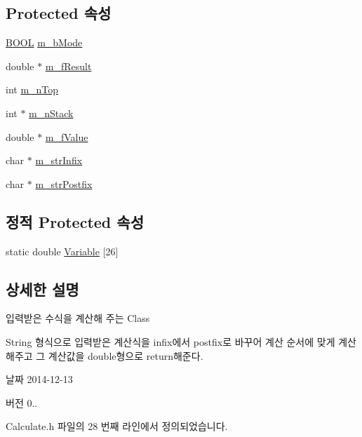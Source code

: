 \subsection*{Protected 속성}
\begin{DoxyCompactItemize}
\item 
\hyperlink{_calculate_8h_a3e5b8192e7d9ffaf3542f1210aec18dd}{B\+O\+O\+L} \hyperlink{class_calculate_a91ed53268a8f29f54757037bc28d35e0}{m\+\_\+b\+Mode}
\item 
double $\ast$ \hyperlink{class_calculate_a5ffe97b9c4358acf90360d328b9144c0}{m\+\_\+f\+Result}
\item 
int \hyperlink{class_calculate_a9f6afe7d8278100e1f27977aaeba0a72}{m\+\_\+n\+Top}
\item 
int $\ast$ \hyperlink{class_calculate_ae2a302680f654bfa735b1dc4f34814b6}{m\+\_\+n\+Stack}
\item 
double $\ast$ \hyperlink{class_calculate_a7ded18ea2282684cf9570cceadbcbf37}{m\+\_\+f\+Value}
\item 
char $\ast$ \hyperlink{class_calculate_a1b964b49f9a186fa02643c1361ccd4ab}{m\+\_\+str\+Infix}
\item 
char $\ast$ \hyperlink{class_calculate_aceafe6d40cd154f9535dc971c1e9bb7a}{m\+\_\+str\+Postfix}
\end{DoxyCompactItemize}
\subsection*{정적 Protected 속성}
\begin{DoxyCompactItemize}
\item 
static double \hyperlink{class_calculate_a75fc03f230ef600e36be8073acc34216}{Variable} \mbox{[}26\mbox{]}
\end{DoxyCompactItemize}


\subsection{상세한 설명}
입력받은 수식을 계산해 주는 Class 

String 형식으로 입력받은 계산식을 infix에서 postfix로 바꾸어 계산 순서에 맞게 계산해주고 그 계산값을 double형으로 return해준다. \begin{DoxyDate}{날짜}
2014-\/12-\/13 
\end{DoxyDate}
\begin{DoxyVersion}{버전}
0.. 
\end{DoxyVersion}


Calculate.\+h 파일의 28 번째 라인에서 정의되었습니다.




